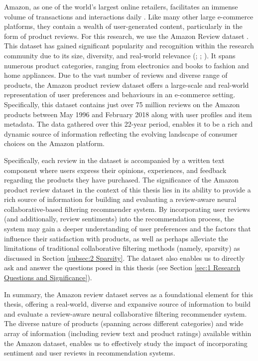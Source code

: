 Amazon, as one of the world's largest online retailers, facilitates an immense volume of transactions and interactions daily \cite{kaushik2018exploring}. Like many other large e-commerce platforms, they contain a wealth of user-generated content, particularly in the form of product reviews. For this research, we use the Amazon Review dataset \cite{mcauley2013hidden}. This dataset has gained significant popularity and recognition within the research community due to its size, diversity, and real-world relevance (\cite{kaushik2018exploring}; \cite{haque2018sentiment}; \cite{skalicky2015statistical}). It spans numerous product categories, ranging from electronics and books to fashion and home appliances. Due to the vast number of reviews and diverse range of products, the Amazon product review dataset offers a large-scale and real-world representation of user preferences and behaviours in an e-commerce setting. Specifically, this dataset contains just over 75 million reviews on the Amazon products between May 1996 and February 2018 along with user profiles and item metadata. The data gathered over this 22-year period, enables it to be a rich and dynamic source of information reflecting the evolving landscape of consumer choices on the Amazon platform.

Specifically, each review in the dataset is accompanied by a written text component where users express their opinions, experiences, and feedback regarding the products they have purchased. The significance of the Amazon product review dataset in the context of this thesis lies in its ability to provide a rich source of information for building and evaluating a review-aware neural collaborative-based filtering recommender system. By incorporating user reviews (and additionally, review sentiments) into the recommendation process, the system may gain a deeper understanding of user preferences and the factors that influence their satisfaction with products, as well as perhaps alleviate the limitations of traditional collaborative filtering methods (namely, sparsity) as discussed in Section \ref{subsec:2 Sparsity}. The dataset also enables us to directly ask and answer the questions posed in this thesis (see Section \ref{sec:1 Research Questions and Significance}). 

In summary, the Amazon review dataset serves as a foundational element for this thesis, offering a real-world, diverse and expansive source of information to build and evaluate a review-aware neural collaborative filtering recommender system. The diverse nature of products (spanning across different categories) and wide array of information (including review text and product ratings) available within the Amazon dataset, enables us to effectively study the impact of incorporating sentiment and user reviews in recommendation systems. 



